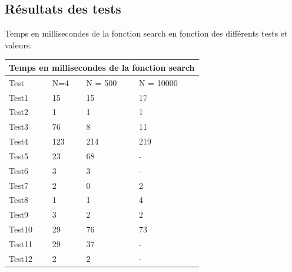 \documentclass[utf8]{article}
\begin{document}
\begin{large}
  \subsection{Résultats des tests}
  \indent
  \par
  Temps en millisecondes de la fonction search en fonction des différents tests et valeurs.

  \begin{tabular}{ |p{3cm}||p{3cm}|p{3cm}|p{3cm}|  }
    \hline
    \multicolumn{4}{|c|}{Temps en millisecondes de la fonction search} \\
    \hline
    Test   & N=4 & N = 500 & N = 10000                                 \\
    \hline
    Test1  & 15  & 15      & 17                                        \\
    Test2  & 1   & 1       & 1                                         \\
    Test3  & 76  & 8       & 11                                        \\
    Test4  & 123 & 214     & 219                                       \\
    Test5  & 23  & 68      & -                                         \\
    Test6  & 3   & 3       & -                                         \\
    Test7  & 2   & 0       & 2                                         \\
    Test8  & 1   & 1       & 4                                         \\
    Test9  & 3   & 2       & 2                                         \\
    Test10 & 29  & 76      & 73                                        \\
    Test11 & 29  & 37      & -                                         \\
    Test12 & 2   & 2       & -                                         \\
    \hline
  \end{tabular}


\end{large}
\end{document}
